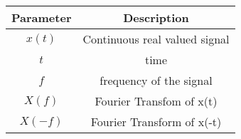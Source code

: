 \renewcommand{\arraystretch}{1.5}
\begin{tabular}{|c|c|}
\hline
Parameter & Description  \\\hline
\( x(t) \) & Continuous real valued signal  \\\hline
\(t \) & time \\\hline
\(f \) & frequency of the signal \\\hline
\(X(f)\)& Fourier Transfom of x(t)\\\hline
\(X(-f)\)& Fourier Transform of x(-t)\\\hline
\end{tabular}
